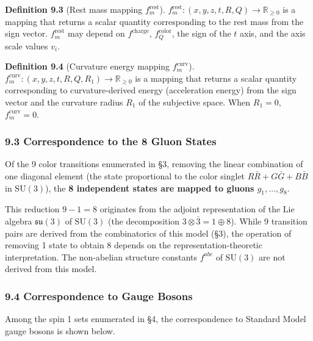 \documentclass[
  a4paper,11pt]{article}
\theoremstyle{definition}
\theoremstyle{remark}
\begin{document}
\textbf{Definition 9.3} (Rest mass mapping \(f_m^{\text{rest}}\)).
\(f_m^{\text{rest}}: (x, y, z, t, R, Q) \to \mathbb{R}_{\geq 0}\) is a
mapping that returns a scalar quantity corresponding to the rest mass
from the sign vector. \(f_m^{\text{rest}}\) may depend on
\(f^{\text{charge}}\), \(f_Q^{\text{color}}\), the sign of the \(t\)
axis, and the axis scale values \(v_i\).

\textbf{Definition 9.4} (Curvature energy mapping
\(f_m^{\text{curv}}\)).
\(f_m^{\text{curv}}: (x, y, z, t, R, Q, R_1) \to \mathbb{R}_{\geq 0}\)
is a mapping that returns a scalar quantity corresponding to
curvature-derived energy (acceleration energy) from the sign vector and
the curvature radius \(R_1\) of the subjective space. When \(R_1 = 0\),
\(f_m^{\text{curv}} = 0\).

\subsubsection{9.3 Correspondence to the 8 Gluon
States}\label{correspondence-to-the-8-gluon-states}

Of the 9 color transitions enumerated in §3, removing the linear
combination of one diagonal element (the state proportional to the color
singlet \(R\bar{R} + G\bar{G} + B\bar{B}\) in \(\mathrm{SU}(3)\)), the
\textbf{8 independent states are mapped to gluons \(g_1, \ldots, g_8\)}.

This reduction \(9 - 1 = 8\) originates from the adjoint representation
of the Lie algebra \(\mathfrak{su}(3)\) of \(\mathrm{SU}(3)\) (the
decomposition \(3 \otimes \bar{3} = 1 \oplus 8\)). While 9 transition
pairs are derived from the combinatorics of this model (§3), the
operation of removing 1 state to obtain 8 depends on the
representation-theoretic interpretation. The non-abelian structure
constants \(f^{abc}\) of \(\mathrm{SU}(3)\) are not derived from this
model.

\subsubsection{9.4 Correspondence to Gauge
Bosons}\label{correspondence-to-gauge-bosons}

Among the spin 1 sets enumerated in §4, the correspondence to Standard
Model gauge bosons is shown below.
\end{document}
